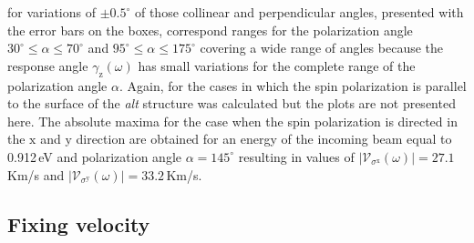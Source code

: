 \documentclass[prb,11pt,tightenlines,twocolumn,aps]{revtex4-1}
\begin{document}
for variations of $\pm0.5^{\circ}$ of those collinear and perpendicular angles,
presented with the error bars on the boxes, correspond ranges for the
polarization angle $30^{\circ} \leq \alpha \leq 70^{\circ}$ and $95^{\circ} \leq
\alpha \leq 175^{\circ}$ covering a wide range of angles because the response
angle $\gamma_{\mathrm{z}}(\omega)$ has small variations for the complete range
of the polarization angle $\alpha$.
% 
Again, for the cases in which the spin polarization is parallel to the surface
of the \emph{alt} structure was calculated but the plots are not presented here.
The absolute maxima for the case when the spin polarization is directed in the
$\mathrm{x}$ and $\mathrm{y}$ direction are obtained for an energy of the
incoming beam equal to 0.912\,eV and polarization angle $\alpha=145^{\circ}$
resulting in values of $|\mathcal{V}_{\sigma^{\mathrm{x}}}(\omega)|=27.1$\,Km/s
and $|\mathcal{V}_{\sigma^{\mathrm{y}}}(\omega)|=33.2$\,Km/s.



\subsection{Fixing velocity} %
\label{sec:res-fixvel}


\end{document}
